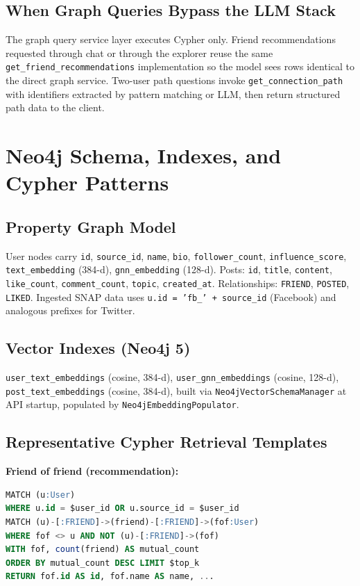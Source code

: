 \documentclass[conference]{IEEEtran}
\begin{document}
\subsection{When Graph Queries Bypass the LLM Stack}
The graph query service layer executes Cypher only. Friend recommendations requested through chat or through the explorer reuse the same \texttt{get\_friend\_recommendations} implementation so the model sees rows identical to the direct graph service. Two-user path questions invoke \texttt{get\_connection\_path} with identifiers extracted by pattern matching or LLM, then return structured path data to the client.

\section{Neo4j Schema, Indexes, and Cypher Patterns}
\label{sec:neo4j_cypher}

\subsection{Property Graph Model}
User nodes carry \texttt{id}, \texttt{source\_id}, \texttt{name}, \texttt{bio}, \texttt{follower\_count}, \texttt{influence\_score}, \texttt{text\_embedding} (384-d), \texttt{gnn\_embedding} (128-d). Posts: \texttt{id}, \texttt{title}, \texttt{content}, \texttt{like\_count}, \texttt{comment\_count}, \texttt{topic}, \texttt{created\_at}. Relationships: \texttt{FRIEND}, \texttt{POSTED}, \texttt{LIKED}. Ingested SNAP data uses \texttt{u.id = 'fb\_' + source\_id} (Facebook) and analogous prefixes for Twitter.

\subsection{Vector Indexes (Neo4j 5)}
\texttt{user\_text\_embeddings} (cosine, 384-d), \texttt{user\_gnn\_embeddings} (cosine, 128-d), \texttt{post\_text\_embeddings} (cosine, 384-d), built via \texttt{Neo4jVectorSchemaManager} at API startup, populated by \texttt{Neo4jEmbeddingPopulator}.

\subsection{Representative Cypher Retrieval Templates}

\noindent\textbf{Friend of friend (recommendation):}
\begin{lstlisting}[language=SQL, basicstyle=\ttfamily\tiny]
MATCH (u:User)
WHERE u.id = $user_id OR u.source_id = $user_id
MATCH (u)-[:FRIEND]->(friend)-[:FRIEND]->(fof:User)
WHERE fof <> u AND NOT (u)-[:FRIEND]->(fof)
WITH fof, count(friend) AS mutual_count
ORDER BY mutual_count DESC LIMIT $top_k
RETURN fof.id AS id, fof.name AS name, ...
\end{lstlisting}
\end{document}
